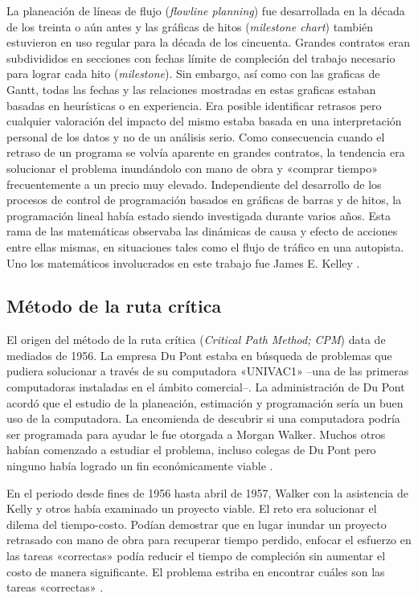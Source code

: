 \documentclass[spanish,draft,12pt,headsepline,footsepline,paper=letter]{scrreprt}
\begin{document}
La planeación de líneas de flujo (\textit{flowline planning}) fue desarrollada en la década de los treinta o aún antes y las gráficas de hitos (\textit{milestone chart}) también estuvieron en uso regular para la década de los cincuenta. Grandes contratos eran subdivididos en secciones con fechas límite de compleción del trabajo necesario para lograr cada hito (\textit{milestone}). Sin embargo, así como con las graficas de Gantt, todas las fechas y las relaciones mostradas en estas graficas estaban basadas en heurísticas o en experiencia. Era posible identificar retrasos pero cualquier valoración del impacto del mismo estaba basada en una interpretación personal de los datos y no de un análisis serio. Como consecuencia cuando el retraso de un programa se volvía aparente en grandes contratos, la tendencia era solucionar el problema inundándolo con mano de obra y «comprar tiempo» frecuentemente a un precio muy elevado.
%
Independiente del desarrollo de los procesos de control de programación basados en gráficas de barras y de hitos, la programación lineal había estado siendo investigada durante varios años. Esta rama de las matemáticas observaba las dinámicas de causa y efecto de acciones entre ellas mismas, en situaciones tales como el flujo de tráfico en una autopista. Uno los matemáticos involucrados en este trabajo fue James E. Kelley \citep[p.~4]{Weaver2006}.

\subsection{Método de la ruta crítica} %
\label{sub:Metodo_ruta_critica}

El origen del método de la ruta crítica (\textit{Critical Path Method; CPM}) data de mediados de 1956. La empresa Du Pont estaba en búsqueda de problemas que pudiera solucionar a través de su computadora «UNIVAC1» –una de las primeras computadoras instaladas en el ámbito comercial–. La administración de Du Pont acordó que el estudio de la planeación, estimación y programación sería un buen uso de la computadora. La encomienda de descubrir si una computadora podría ser programada para ayudar le fue otorgada a Morgan Walker. Muchos otros habían comenzado a estudiar el problema, incluso colegas de Du Pont pero ninguno había logrado un fin económicamente viable \citep[p.~4,~5]{Weaver2006}.

En el periodo desde fines de 1956 hasta abril de 1957, Walker con la asistencia de Kelly y otros había examinado un proyecto viable. El reto era solucionar el dilema del tiempo-costo. Podían demostrar que en lugar inundar un proyecto retrasado con mano de obra para recuperar tiempo perdido, enfocar el esfuerzo en las tareas «correctas» podía reducir el tiempo de compleción sin aumentar el costo de manera significante. El problema estriba en encontrar cuáles son las tareas «correctas» \citep[p.~5]{Weaver2006}.
\end{document}
